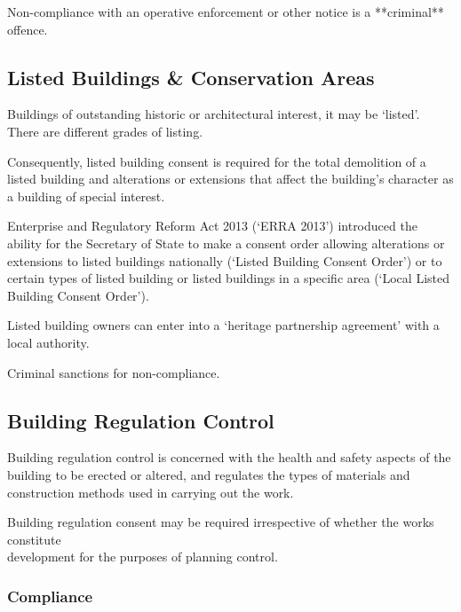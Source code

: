 \documentclass[
]{article}
\newenvironment{Shaded}{}{}
\newcommand{\NormalTok}[1]{#1}
\begin{document}
\begin{Shaded}
\begin{Highlighting}[]
\NormalTok{Non{-}compliance with an operative enforcement or other notice is a **criminal** offence.}
\end{Highlighting}
\end{Shaded}

\hypertarget{listed-buildings-conservation-areas}{%
\subsection{Listed Buildings \& Conservation
Areas}\label{listed-buildings-conservation-areas}}

Buildings of outstanding historic or architectural interest, it may be
`listed'. There are different grades of listing.

Consequently, listed building consent is required for the total
demolition of a listed building and alterations or extensions that
affect the building's character as a building of special interest.

Enterprise and Regulatory Reform Act 2013 (`ERRA 2013') introduced the
ability for the Secretary of State to make a consent order allowing
alterations or extensions to listed buildings nationally (`Listed
Building Consent Order') or to certain types of listed building or
listed buildings in a specific area (`Local Listed Building Consent
Order').

Listed building owners can enter into a `heritage partnership agreement'
with a local authority.

Criminal sanctions for non-compliance.

\hypertarget{building-regulation-control}{%
\subsection{Building Regulation
Control}\label{building-regulation-control}}

Building regulation control is concerned with the health and safety
aspects of the building to be erected or altered, and regulates the
types of materials and construction methods used in carrying out the
work.

Building regulation consent may be required irrespective of whether the
works constitute\\
development for the purposes of planning control.

\hypertarget{compliance}{%
\subsubsection{Compliance}\label{compliance}}
\end{document}
